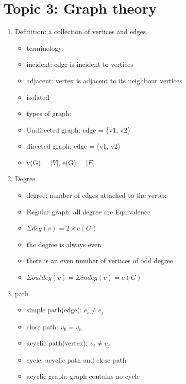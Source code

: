 \documentclass[11pt, a4paper]{article}
\begin{document}
\section*{Topic 3: Graph theory}
    \begin{enumerate}
        \item Definition: a collection of vertices and edges
            \begin{itemize}
                \item terminology:
                \item incident: edge is incident to vertices
                \item adjacent: vertex is adjacent to its neighbour vertices
                \item isolated
                \item types of graph:
                \item Undirected graph: edge = \{v1, v2\}
                \item directed graph: edge = (v1, v2)
                \item v(G) = $|V|$, e(G) = $|E|$
            \end{itemize}
        \item Degree
            \begin{itemize}
                \item degree: number of edges attached to the vertex
                \item Regular graph: all degree are Equivalence
                \item $\Sigma deg(v) = 2 \times e(G)$
                \item the degree is always even
                \item there is an even number of vertices of odd degree
                \item $\Sigma outdeg(v) = \Sigma indeg(v) = e(G)$
            \end{itemize}
        \item path
            \begin{itemize}
                \item simple path(edge): $e_i \neq e_j$
                \item close path: $v_0 = v_n$
                \item acyclic path(vertex): $v_i \neq v_j$
                \item cycle: acyclic path and close path
                \item acyclic graph: graph contains no cycle

\end{itemize}
\end{enumerate}
\end{document}
